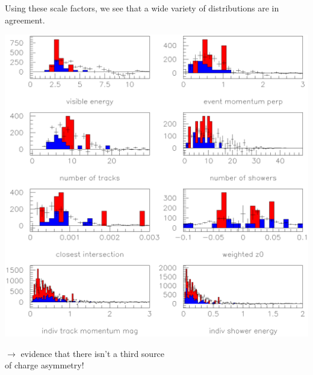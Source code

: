 \begin{slide*}

\slideframe{}
\huge
{}

\begin{minipage}[t]{\linewidth}
\LARGE

Using these scale factors, we see that a wide variety of distributions
are in agreement.

\begin{center}
  \includegraphics[width=0.80\linewidth]{beamgas_norm_is_good.eps}
\begin{minipage}{5 in}
$\longrightarrow$ evidence that there isn't a third source \\ \hspace{1 in} of charge
asymmetry!
\end{minipage}
\end{center}


\end{minipage}

\end{slide*}




